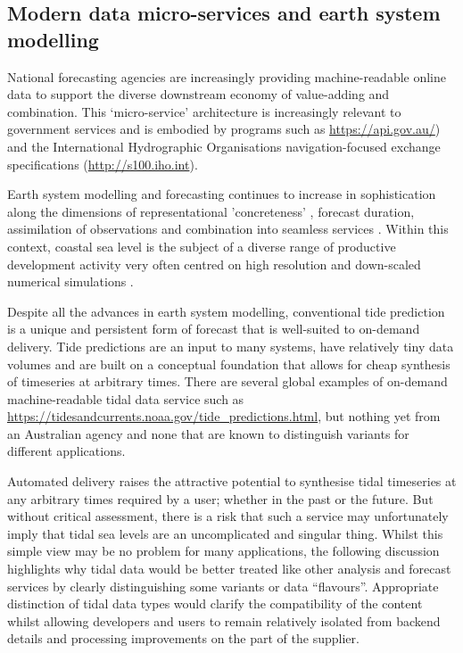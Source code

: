 \subsection{Modern data micro-services and earth system modelling}
National forecasting agencies are increasingly providing machine-readable online data to support the diverse downstream economy of value-adding and combination.
This `micro-service' architecture \citep{BCG2020} is increasingly relevant to government services and is embodied by programs such as  \url{https://api.gov.au/}) and the International Hydrographic Organisations  navigation-focused exchange specifications (\url{http://s100.iho.int}).

 
Earth system modelling and forecasting continues to increase in sophistication along the dimensions of representational 'concreteness' \citep{Petersen:2012kp}, forecast duration, assimilation of observations and combination into seamless services \cite{BOM2020}.
Within this context, coastal sea level is the subject of a diverse range of productive development activity very often centred on high resolution and down-scaled numerical simulations \citep{10.3389/fmars.2019.00437}. 


Despite all the advances in earth system modelling, conventional tide prediction is a unique and persistent form of forecast that is well-suited to on-demand delivery.  Tide predictions are an input to many systems, have relatively tiny data volumes and are built on a conceptual foundation that allows for cheap synthesis of timeseries at arbitrary times.    There are several global examples of on-demand machine-readable tidal data service such as  \url{https://tidesandcurrents.noaa.gov/tide_predictions.html}, but nothing yet from an Australian agency and none that are known to distinguish variants for different applications.


Automated delivery raises the attractive potential to synthesise tidal timeseries at any arbitrary times required by a user; whether in the past or the future.   But without critical assessment,  there is a risk that such a service may unfortunately imply that tidal sea levels are an uncomplicated and singular thing.    
Whilst this simple view may be no problem for many applications, the following discussion highlights why tidal data would be better treated like other analysis and forecast services by clearly distinguishing some variants or data ``flavours''. 
Appropriate distinction of tidal data types would clarify the compatibility of the content whilst allowing developers and users to remain relatively isolated from backend details and processing improvements on the part of the supplier.

